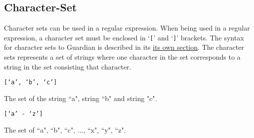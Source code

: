 
\subsection{Character-Set}
{
	Character sets can be used in a regular expression.
	When being used in a regular expression, a character set must be enclosed in
	`\texttt{[}' and `\texttt{]}' brackets.
	The syntax for character sets to Guardian is described in its
	\hyperref[sec:charset]{its own section}.
	The character sets represents a set of strings where one character
	in the set corresponds to a string in the set consisting that character.
	
	\begin{itemize}
	{
		\item \texttt{[`a', `b', `c']}
		
			The set of the string ``a", string
			``b" and string "c".
		
		\item \texttt{[`a' - `z']}
		
			The set of ``a", ``b", ``c", ..., ``x", ``y", ``z".
	}
	\end{itemize}
	
}
